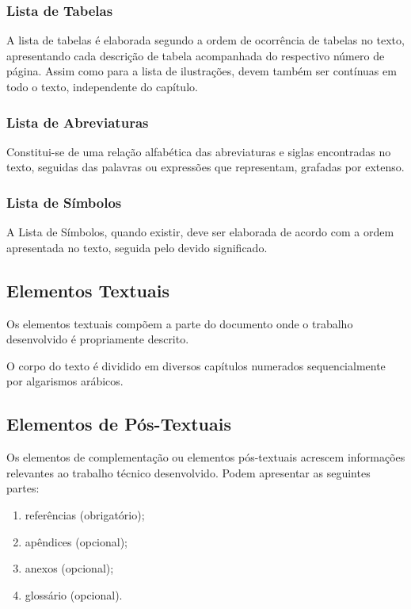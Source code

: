 \documentclass[repeatfields,xlists,xpacks,oneside]{ufrgscca}
\begin{document}
\subsubsection{Lista de Tabelas}

A lista de tabelas é elaborada segundo a ordem de ocorrência de tabelas no
texto, apresentando cada descrição de tabela acompanhada do respectivo
número de página. Assim como para a lista de ilustrações, devem também ser
contínuas em todo o texto, independente do capítulo.


\subsubsection{Lista de Abreviaturas}

Constitui-se de uma relação alfabética das abreviaturas e siglas encontradas
no texto, seguidas das palavras ou expressões que representam, grafadas por
extenso.

\subsubsection{Lista de Símbolos}

A Lista de Símbolos, quando existir, deve ser elaborada de acordo  com a
ordem apresentada no texto, seguida pelo devido significado.

\subsection{Elementos Textuais}

Os elementos textuais compõem a parte do documento onde o trabalho
desenvolvido é propriamente descrito.

O corpo do texto é dividido em diversos capítulos numerados sequencialmente
por algarismos arábicos.

\subsection{Elementos de Pós-Textuais}

Os elementos de complementação ou elementos pós-textuais acrescem
informações relevantes ao trabalho técnico desenvolvido. Podem apresentar as
seguintes partes:

\begin{enumerate}
\item referências (obrigatório);
\item apêndices (opcional);
\item anexos (opcional);
\item glossário (opcional).
\end{enumerate}
\end{document}
